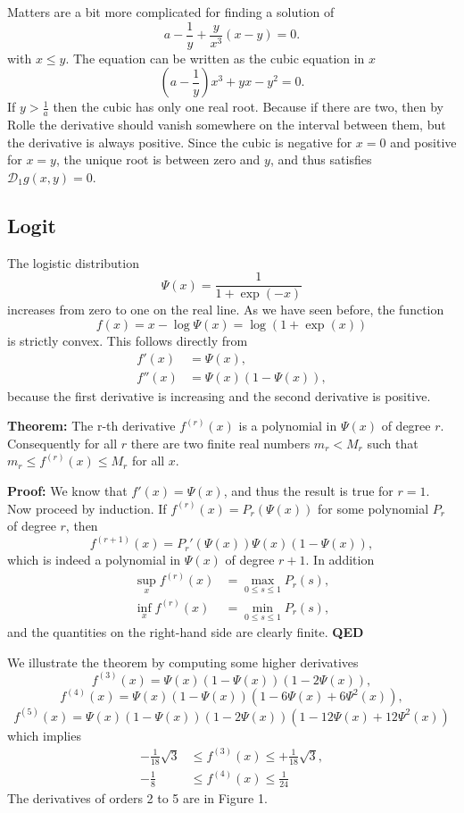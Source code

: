 \documentclass[
  12pt,
]{book}
\begin{document}
Matters are a bit more complicated for finding a solution of
\[
a-\frac{1}{y}+\frac{y}{x^3}(x-y)=0.
\]
with \(x\leq y\). The equation can be written as the cubic equation in \(x\)
\[
(a-\frac{1}{y})x^3+yx-y^2=0.
\]
If \(y>\frac{1}{a}\) then the cubic has only one real root. Because if there are two, then by Rolle the derivative should vanish somewhere on the interval between them, but the
derivative is always positive. Since the cubic is negative for \(x=0\) and positive for \(x=y\), the unique root is between zero and \(y\), and thus satisfies \(\mathcal{D}_1g(x,y)=0\).

\hypertarget{logit}{%
\subsection{Logit}\label{logit}}

The logistic distribution
\[
\Psi(x)=\frac{1}{1+\exp(-x)}
\]
increases from zero to one on the real line.
As we have seen before, the function
\[
f(x)=x-\log\Psi(x)=\log(1+\exp(x))
\]
is strictly convex. This follows directly from
\begin{align*}
f'(x)&=\Psi(x),\\
f''(x)&=\Psi(x)(1-\Psi(x)),
\end{align*}
because the first derivative is increasing and the second derivative is positive.

\textbf{Theorem:}
The r-th derivative \(f^{(r)}(x)\) is
a polynomial in \(\Psi(x)\) of degree \(r\). Consequently for all \(r\) there are two finite real numbers \(m_{r}<M_{r}\) such that \(m_{r}\leq f^{(r)}(x)\leq M_{r}\) for all \(x\).

\textbf{Proof:}
We know that \(f'(x)=\Psi(x)\), and thus the result is true for \(r=1\). Now proceed
by induction. If \(f^{(r)}(x)=P_{r}(\Psi(x))\) for some polynomial \(P_{r}\) of degree \(r\), then
\[
f^{(r+1)}(x)=P_{r}'(\Psi(x))\Psi(x)(1-\Psi(x)),
\]
which is indeed a polynomial in \(\Psi(x)\)
of degree \(r+1\). In addition
\begin{align*}
\sup_{x}f^{(r)}(x)&=\max_{0\leq s\leq 1}P_{r}(s),\\
\inf_{x}f^{(r)}(x)&=\min_{0\leq s\leq 1}P_{r}(s),
\end{align*}
and the quantities on the right-hand side are clearly finite.
\textbf{QED}

We illustrate the theorem by computing some higher derivatives
\[
f^{(3)}(x)=\Psi(x)(1-\Psi(x))(1-2\Psi(x)),
\]
\[
f^{(4)}(x)=\Psi(x)(1-\Psi(x))(1-6\Psi(x)+6\Psi^{2}(x)),
\]
\[
f^{(5)}(x)=\Psi(x)(1-\Psi(x))(1-2\Psi(x))(1-12\Psi(x)+12\Psi^{2}(x))
\]
which implies
\begin{align*}
 -\frac{1}{18}\sqrt{3}&\leq f^{(3)}(x)\leq+\frac{1}{18}\sqrt{3},\\
-\frac18&\leq f^{(4)}(x)\leq\frac{1}{24}
\end{align*}
The derivatives of orders 2 to 5 are in Figure 1.
\end{document}
